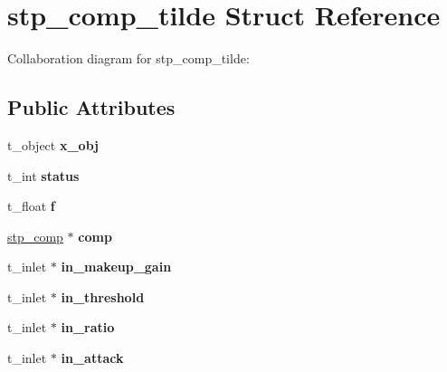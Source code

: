 \hypertarget{structstp__comp__tilde}{}\section{stp\+\_\+comp\+\_\+tilde Struct Reference}
\label{structstp__comp__tilde}


Collaboration diagram for stp\+\_\+comp\+\_\+tilde\+:
\subsection*{Public Attributes}
\begin{DoxyCompactItemize}
\item 
\mbox{\label{structstp__comp__tilde_a796cd6d44749e53a8b7dcaab435065ca}} 
t\+\_\+object {\bfseries x\+\_\+obj}
\item 
\mbox{\label{structstp__comp__tilde_a0c1aaf3a40d2893acee97b0d197844d5}} 
t\+\_\+int {\bfseries status}
\item 
\mbox{\label{structstp__comp__tilde_a5e5a79e9fffc03bb53c1ea16010ab29c}} 
t\+\_\+float {\bfseries f}
\item 
\mbox{\label{structstp__comp__tilde_ad49296e741fda62e9794c678dc10139e}} 
\mbox{\hyperlink{structstp__comp}{stp\+\_\+comp}} $\ast$ {\bfseries comp}
\item 
\mbox{\label{structstp__comp__tilde_a95c29f1cc8fa029832307821747df7ef}} 
t\+\_\+inlet $\ast$ {\bfseries in\+\_\+makeup\+\_\+gain}
\item 
\mbox{\label{structstp__comp__tilde_a3760500c12f4787f9777151c4941b942}} 
t\+\_\+inlet $\ast$ {\bfseries in\+\_\+threshold}
\item 
\mbox{\label{structstp__comp__tilde_aa307251dab667e4aabd28065e3ba5627}} 
t\+\_\+inlet $\ast$ {\bfseries in\+\_\+ratio}
\item 
\mbox{\label{structstp__comp__tilde_a99edf7b09604cf40bbe9070a09dfa7a6}} 
t\+\_\+inlet $\ast$ {\bfseries in\+\_\+attack}
\item 

\end{DoxyCompactItemize}
